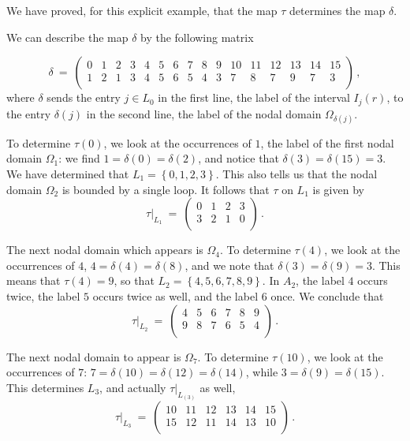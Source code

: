 \documentclass[12pt,a4paper]{amsart}
\theoremstyle{plain} %
\theoremstyle{definition}
\numberwithin{equation}{section}
\numberwithin{figure}{section}
\numberwithin{table}{section}
\newcommand{\set}[1]{\left\lbrace #1 \right\rbrace}
\begin{document}
We have proved, for this explicit example, that the map $\tau$ determines the map $\delta$.\medskip


We can describe the map $\delta$ by the following matrix
%

\begin{equation}%
\delta ~=~
\begin{pmatrix}
  0 & 1 & 2 & 3 & 4 & 5 & 6 & 7 & 8 & 9 & 10 & 11 & 12 & 13 & 14 & 15 \\
  1 & 2 & 1 & 3 & 4 & 5 & 6 & 5 & 4 & 3 & 7 & 8 & 7 & 9 & 7 & 3  \\
\end{pmatrix}\,,
\end{equation}
%
where $\delta$ sends the entry $j \in L_0$ in the first line, the label of the interval $I_j(r)$, to the entry $\delta(j)$ in the second line, the label of the nodal domain $\Omega_{\delta(j)}$. \smallskip

To determine $\tau(0)$, we look at the occurrences of $1$, the label of the first nodal domain $\Omega_1$: we find $1 = \delta(0) = \delta(2)$, and notice that $\delta(3)=\delta(15)=3$. We have determined that $L_1 = \set{0,1,2,3}$. This also tells us that the nodal domain $\Omega_2$ is bounded by a single loop. It follows that $\tau$ on $L_1$ is given by
%
\begin{equation*}
\tau|_{L_1} ~=~
\begin{pmatrix}
  0 & 1 & 2 & 3 \\
  3 & 2 & 1 & 0 \\
\end{pmatrix}\,.
\end{equation*}

The next nodal domain which appears is $\Omega_4$. To determine $\tau(4)$, we look at the occurrences of $4$, $4 = \delta(4) = \delta(8)$, and we note that $\delta(3) = \delta(9)= 3$. This means that $\tau(4) = 9$, so that $L_2 = \set{4,5,6,7,8,9}$. In $A_2$, the label $4$ occurs twice, the label $5$ occurs twice as well, and the label $6$ once. We conclude that
%
\begin{equation*}
\tau|_{L_2} ~=~
\begin{pmatrix}
  4 & 5 & 6 & 7 & 8 & 9 \\
  9 & 8 & 7 & 6 & 5 & 4 \\
\end{pmatrix}\,.
\end{equation*}

The next nodal domain to appear is $\Omega_7$. To determine $\tau(10)$, we look at the occurrences of $7$: $7 = \delta(10) = \delta(12) = \delta(14)$, while $3 = \delta(9) = \delta(15)$. This determines $L_3$, and actually $\tau|_{L_(3)}$ as well,
%
\begin{equation*}
\tau|_{L_3} ~=~
\begin{pmatrix}
  10 & 11 & 12 & 13 & 14 & 15 \\
  15 & 12 & 11 & 14 & 13 & 10 \\
\end{pmatrix}\,.
\end{equation*}
\end{document}
